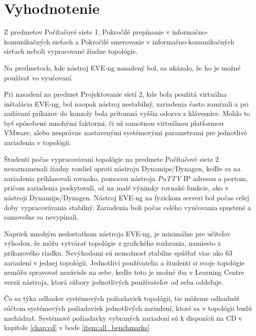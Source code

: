 \section{Vyhodnotenie}

Z predmetov Počítačové siete 1, Pokročilé prepínanie v informačno-komunikačných sieťach a Pokročilé smerovanie v informačno-komunikačných sieťach neboli vypracované žiadne topológie.

Na predmetoch, kde nástroj EVE-ng nasadený bol, sa ukázalo, že ho je možné používať vo vyučovaní.

Pri nasadení na predmet Projektovanie sietí 2, kde bola použitá virtuálna inštalácia EVE-ng, bol naopak nástroj nestabilný, zariadenia často zamŕzali a pri zadávaní príkazov do konzoly bola prítomná vyššia odozva z klávesnice. Mohlo to byť spôsobené mnohými faktormi, či už samotnou virtuálnou platformou VMware, alebo nesprávne nastavenými systémovými parametrami pre jednotlivé zariadenia v topológii.

Študenti počas vypracovávaní topológie na predmete Počítačové siete 2 nezaznamenali žiadny rozdiel oproti nástroju Dynamips/Dynagen, keďže sa na zariadenia prihlasovali rovnako, pomocou nástroja \emph{PuTTY} IP adresou a portom, pričom zariadenia poskytovali, až na malé výnimky rovnaké funkcie, ako v nástroji Dynamips/Dynagen. Nástroj EVE-ng na fyzickom serveri bol počas celej doby vypracovávania stabilný. Zariadenia boli počas celého vyučovania spustené a samovoľne sa nevypínali.

Napriek mnohým nedostatkom nástroja EVE-ng, je minimálne pre učiteľov výhodou, že môžu vytvárať topológie z grafického rozhrania, namiesto z príkazového riadku. Nevýhodami sú nemožnosť stabilne spúšťať viac ako 63 zariadení v jednej topológii. Jednotliví používatelia a študenti si svoje topológie nemôžu spravovať nezávisle na sebe, keďže toto je možné iba v Learning Centre verzii nástroja, ktorá súbory jednotlivých používateľov od seba oddeľuje.

Čo sa týka odhadov systémových požiadaviek topológii, tie môžeme odhadnúť súčtom systémových požiadaviek jednotlivých zariadení, ktoré sa v topológii budú nachádzať. Systémové požiadavky vybraných zariadení sú k dispozícii na CD v kapitole \ref{chap:cd} v bode \ref{item:all_benchmarks}